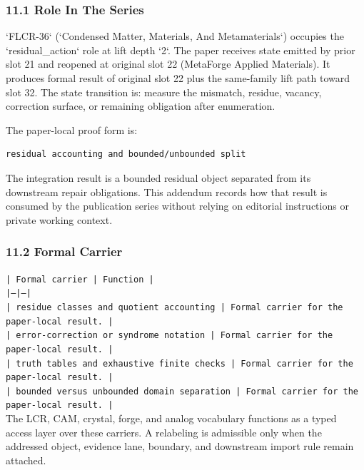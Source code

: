 \documentclass[11pt]{article}
\begin{document}
\subsubsection*{11.1 Role In The Series}

`FLCR-36` (`Condensed Matter, Materials, And Metamaterials`) occupies the `residual\_action` role at lift depth `2`.
The paper receives state emitted by prior slot 21 and reopened at original slot 22 (MetaForge Applied Materials). It produces formal result of original slot 22 plus the same-family lift path toward slot 32. The state transition is:
measure the mismatch, residue, vacancy, correction surface, or remaining obligation after enumeration.

The paper-local proof form is:

\begin{verbatim}
residual accounting and bounded/unbounded split
\end{verbatim}

The integration result is a bounded residual object separated from its downstream repair obligations. This addendum records how that result is
consumed by the publication series without relying on editorial instructions or
private working context.

\subsubsection*{11.2 Formal Carrier}

\noindent\texttt{| Formal carrier | Function |}\\
\noindent\texttt{|---|---|}\\
\noindent\texttt{| residue classes and quotient accounting | Formal carrier for the paper-local result. |}\\
\noindent\texttt{| error-correction or syndrome notation | Formal carrier for the paper-local result. |}\\
\noindent\texttt{| truth tables and exhaustive finite checks | Formal carrier for the paper-local result. |}\\
\noindent\texttt{| bounded versus unbounded domain separation | Formal carrier for the paper-local result. |}\\

The LCR, CAM, crystal, forge, and analog vocabulary functions as a typed access
layer over these carriers. A relabeling is admissible only when the addressed
object, evidence lane, boundary, and downstream import rule remain attached.
\end{document}
